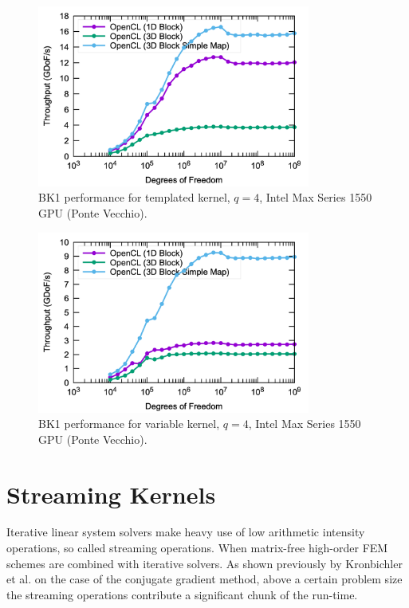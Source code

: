 \documentclass[a4paper,12pt]{article}
\begin{document}
\begin{figure}[htbp]
  \centering
  \includegraphics[width=0.8\textwidth]{pvc_opencl_q4_static} %
  \caption{BK1 performance for templated kernel, $q = 4$, Intel Max Series 1550 GPU (Ponte Vecchio).}
  \label{fig:pvc_static}
\end{figure}

\begin{figure}[htbp]
  \centering
  \includegraphics[width=0.8\textwidth]{pvc_opencl_q4_dynamic} %
  \caption{BK1 performance for variable kernel, $q = 4$, Intel Max Series 1550 GPU (Ponte Vecchio).}
  \label{fig:pvc_dynamic}
\end{figure}

\section{Streaming Kernels}

Iterative linear system solvers make heavy use of low arithmetic intensity operations, so called streaming operations.
When matrix-free high-order FEM schemes are combined with iterative solvers. 
As shown previously by Kronbichler et al. \cite{kronbichler2023enhancing} on the case of the conjugate gradient method, above a certain problem size the streaming operations contribute a significant chunk of the run-time.
\end{document}
